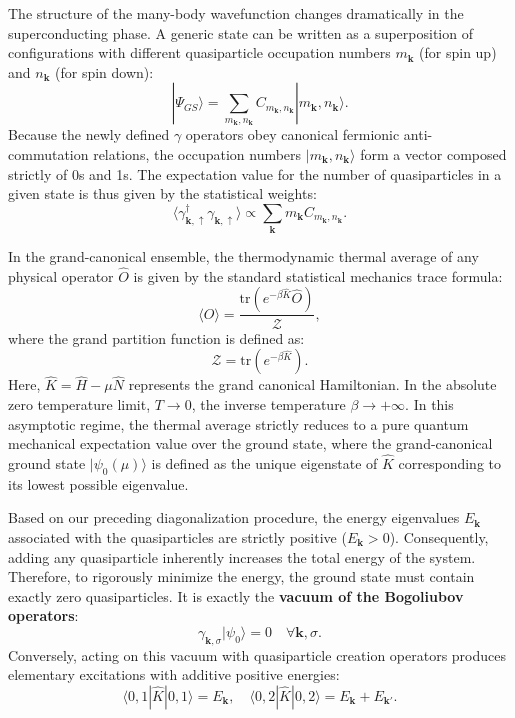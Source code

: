 The structure of the many-body wavefunction changes dramatically in the superconducting phase. A generic state can be written as a superposition of configurations with different quasiparticle occupation numbers \( m_{\mathbf{k}} \) (for spin up) and \( n_{\mathbf{k}} \) (for spin down):
\[
    |\Psi_{GS}\rangle = \sum_{m_{\mathbf{k}},n_{\mathbf{k}}} C_{m_{\mathbf{k}},n_{\mathbf{k}}} |m_{\mathbf{k}},n_{\mathbf{k}}\rangle.
\]
Because the newly defined \( \gamma \) operators obey canonical fermionic anti-commutation relations, the occupation numbers \( |m_{\mathbf{k}},n_{\mathbf{k}}\rangle \) form a vector composed strictly of 0s and 1s. The expectation value for the number of quasiparticles in a given state is thus given by the statistical weights:
\[
    \langle \gamma_{\mathbf{k},\uparrow}^\dagger \gamma_{\mathbf{k},\uparrow} \rangle \propto \sum_{\mathbf{k}} m_{\mathbf{k}} C_{m_{\mathbf{k}},n_{\mathbf{k}}}.
\]

In the grand-canonical ensemble, the thermodynamic thermal average of any physical operator \( \hat{O} \) is given by the standard statistical mechanics trace formula:
\[
    \langle O \rangle = \frac{\text{tr}\left(e^{-\beta \hat{K}} \hat{O}\right)}{\mathcal{Z}},
\]
where the grand partition function is defined as:
\[
    \mathcal{Z} = \text{tr}\left(e^{-\beta \hat{K}}\right).
\]
Here, \( \hat{K} = \hat{H} - \mu \hat{N} \) represents the grand canonical Hamiltonian. In the absolute zero temperature limit, \( T \to 0 \), the inverse temperature \( \beta \to +\infty \). In this asymptotic regime, the thermal average strictly reduces to a pure quantum mechanical expectation value over the ground state, where the grand-canonical ground state \( |\psi_0(\mu)\rangle \) is defined as the unique eigenstate of \( \hat{K} \) corresponding to its lowest possible eigenvalue.

Based on our preceding diagonalization procedure, the energy eigenvalues \( E_{\mathbf{k}} \) associated with the quasiparticles are strictly positive (\( E_{\mathbf{k}} > 0 \)). Consequently, adding any quasiparticle inherently increases the total energy of the system. Therefore, to rigorously minimize the energy, the ground state must contain exactly zero quasiparticles. It is exactly the \textbf{vacuum of the Bogoliubov operators}:
\begin{equation} \label{eq:bcs_vacuum_condition_gamma}
    \gamma_{\mathbf{k},\sigma} |\psi_0\rangle = 0 \quad \forall \mathbf{k}, \sigma.
\end{equation}
Conversely, acting on this vacuum with quasiparticle creation operators produces elementary excitations with additive positive energies:
\[
    \langle 0, 1 | \hat{K} | 0, 1 \rangle = E_{\mathbf{k}}, \quad \langle 0, 2 | \hat{K} | 0, 2 \rangle = E_{\mathbf{k}} + E_{\mathbf{k}'}.
\]

